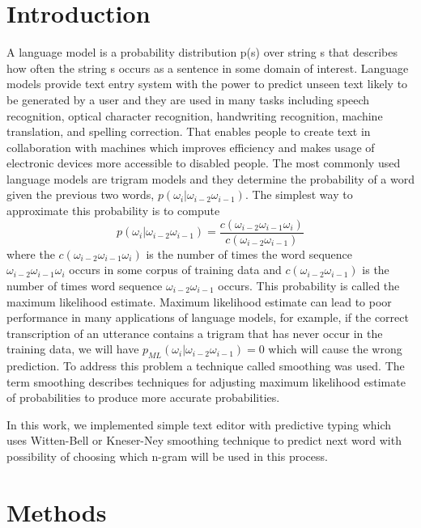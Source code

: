 \documentclass[twoside]{article}
\begin{document}
\begin{multicols}{2}

\section{Introduction}
A language model is a probability distribution p(s) over string s that describes how often the string s occurs as a sentence in some domain of interest. 
Language models provide text entry system with the power to predict unseen text likely to be generated by a user and they are used in many tasks including speech recognition, optical character recognition, handwriting recognition, machine translation, and spelling correction.  That enables people to create text in collaboration with machines which improves efficiency and makes usage of electronic devices more accessible to disabled people. The most commonly used language models are trigram models and they determine the probability of a word given the previous two words, $ p(\omega_i|\omega_{i-2}\omega_{i-1}) $. The simplest way to approximate this probability is to compute 
\begin{equation}
p(\omega_i|\omega_{i-2}\omega_{i-1}) = \frac{c(\omega_{i-2}\omega_{i-1}\omega_i)}{c(\omega_{i-2}\omega_{i-1})}
\end{equation}
where the $ c(\omega_{i-2}\omega_{i-1}\omega_i) $ is the number of times the word sequence $ \omega_{i-2}\omega_{i-1}\omega_i $ occurs in some corpus of training data and $ c(\omega_{i-2}\omega_{i-1}) $ is the number of times word sequence $ \omega_{i-2}\omega_{i-1} $ occurs. This probability is called the maximum likelihood estimate. Maximum likelihood estimate can lead to poor performance in many applications of language models, for example, if the correct transcription of an utterance contains a trigram that has never occur in the training data, we will have $ p_{ML}(\omega_i|\omega_{i-2}\omega_{i-1})=0 $ which will cause the wrong prediction. To address this problem a technique called smoothing was used. The term smoothing describes techniques for adjusting maximum likelihood estimate of probabilities to produce more accurate probabilities. 

In this work, we implemented simple text editor with predictive typing which uses Witten-Bell or Kneser-Ney smoothing technique to predict next word with possibility of choosing which n-gram will be used in this process.  

\section{Methods}


\end{multicols}
\end{document}
